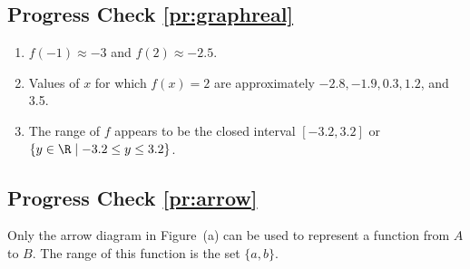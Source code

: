 \subsection*{Progress Check \ref{pr:graphreal}}
\begin{enumerate}
  \item $f(-1) \approx -3$ and $f(2) \approx -2.5$.
  \item Values of $x$ for which $f(x) = 2$ are approximately $-2.8, -1.9, 0.3, 1.2$, and 3.5.
  \item The range of $f$ appears to be the closed interval $[-3.2, 3.2]$ or \\ $\{ y \in \R \mid -3.2 \leq y \leq 3.2 \}$.
\end{enumerate}



\subsection*{Progress Check \ref{pr:arrow}}
Only the arrow diagram in Figure~(a) can be used to represent a function from $A$ to $B$.  The range of this function is the set $\{ a, b \}$.
\hbreak

\endinput

